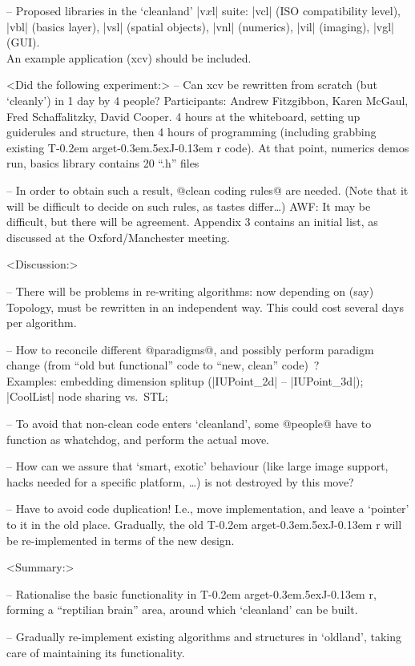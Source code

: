 \documentclass[11pt]{article}
\def\TargetJr{{T\kern-0.2em arget\kern-0.3em\lower.5ex\hbox{\Large J}\kern-0.13em r}}
\begin{document}
-- Proposed libraries in the `cleanland' |v$x$l| suite:
|vcl| (ISO compatibility level), |vbl| (basics layer), |vsl| (spatial objects),
|vnl| (numerics), |vil| (imaging), |vgl| (GUI). \\
An example application (xcv) should be included.

<Did the following experiment:>
-- Can xcv be rewritten from scratch (but `cleanly') in 1 day by 4 people?
Participants: Andrew Fitzgibbon, Karen McGaul, Fred Schaffalitzky, David Cooper.
4 hours at the whiteboard, setting up guiderules and structure, then
4 hours of programming (including grabbing existing \TargetJr{} code).
At that point, numerics demos run, basics library contains 20 ``.h'' files

-- In order to obtain such a result, @clean coding rules@ are needed.
(Note that it will be difficult to decide on such rules, as tastes differ\ldots)
AWF: It may be difficult, but there will be agreement.
Appendix 3 contains an initial list, as discussed at the Oxford/Manchester meeting.

<Discussion:>

-- There will be problems in re-writing algorithms: now depending on (say)
Topology, must be rewritten in an independent way.  This could cost several days
per algorithm.

-- How to reconcile different @paradigms@, and possibly perform paradigm
change (from ``old but functional'' code to ``new, clean'' code)~? \\
Examples: embedding dimension splitup (|IUPoint_2d| -- |IUPoint_3d|);
          |CoolList| node sharing vs.~STL;

-- To avoid that non-clean code enters `cleanland', some @people@ have to
function as whatchdog, and perform the actual move.

-- How can we assure that `smart, exotic' behaviour (like large image support,
hacks needed for a specific platform, \ldots) is not destroyed by this move?

-- Have to avoid code duplication!  I.e., move implementation, and leave a
`pointer' to it in the old place.
Gradually, the old \TargetJr{} will be re-implemented in terms of the new
design.

<Summary:>

-- Rationalise the basic functionality in \TargetJr{}, forming a
``reptilian brain'' area, around which `cleanland' can be built.

-- Gradually re-implement existing algorithms and structures in `oldland',
taking care of maintaining its functionality.
\end{document}
